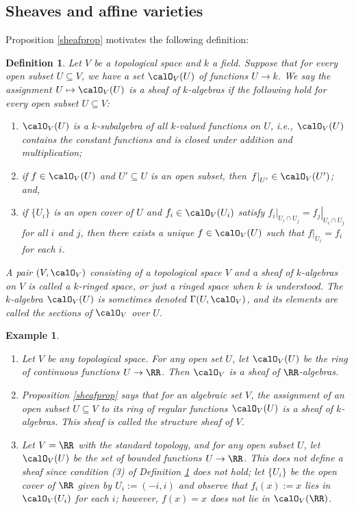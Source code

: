 \documentclass[12pt]{amsart}
\theoremstyle{plain}
\newtheorem{definition}[theorem]{Definition}
\newtheorem{example}[theorem]{Example}
\begin{document}
\subsection{Sheaves and affine varieties}\label{varietiessection}
Proposition \ref{sheafprop} motivates the following definition:

\begin{definition}\label{sheafdef}
Let $V$ be a topological space and $k$ a field.
Suppose that for every open subset $U \subseteq V$, we have a set $\calO_V(U)$ of functions $U \to k$.
We say the assignment $U \mapsto \calO_V(U)$ is a sheaf of $k$-algebras if the following hold for every open subset $U \subseteq V$:
\begin{enumerate}
\item
$\calO_V(U)$ is a $k$-subalgebra of all $k$-valued functions on $U$, i.e., $\calO_V(U)$ contains the constant functions and is closed under addition and multiplication;
\item
if $f \in \calO_V(U)$ and $U'\subseteq U$ is an open subset, then $\left. f \right|_{U'} \in \calO_V(U')$; and,
\item
if $\{U_i\}$ is an open cover of $U$ and $f_i \in \calO_V(U_i)$ satisfy $\left. f_i \right|_{U_i \cap U_j} = \left. f_j \right|_{U_i \cap U_j}$ for all $i$ and $j$, then there exists a unique $f \in \calO_V(U)$ such that $\left. f\right|_{U_i} = f_i$ for each $i$.
\end{enumerate}
A pair $(V, \calO_V)$ consisting of a topological space $V$ and a sheaf of $k$-algebras on $V$ is called a $k$-ringed space, or just a ringed space when $k$ is understood.
The $k$-algebra $\calO_V(U)$ is sometimes denoted $\Gamma(U, \calO_V)$, and its elements are called the sections of $\calO_V$ over $U$.
\end{definition}

\begin{example}
\begin{enumerate}
\item
Let $V$ be any topological space.
For any open set $U$, let $\calO_V(U)$ be the ring of continuous functions $U \to \RR$.
Then $\calO_V$ is a sheaf of $\RR$-algebras.

\item
Proposition \ref{sheafprop} says that for an algebraic set $V$, the assignment of an open subset $U \subseteq V$ to its ring of regular functions $\calO_V(U)$ is a sheaf of $k$-algebras.
This sheaf is called the structure sheaf of $V$.

\item
Let $V = \RR$ with the standard topology, and for any open subset $U$, let $\calO_V(U)$ be the set of bounded functions $U \to \RR$.
This does not define a sheaf since condition (3) of Definition \ref{sheafdef} does not hold;
let $\{U_i\}$ be the open cover of $\RR$ given by $U_i:=(-i, i)$ and observe that $f_i(x):=x$ lies in $\calO_V(U_i)$ for each $i$;
however, $f(x) = x$ does not lie in $\calO_V(\RR)$.

\end{enumerate}
\end{example}
\end{document}
